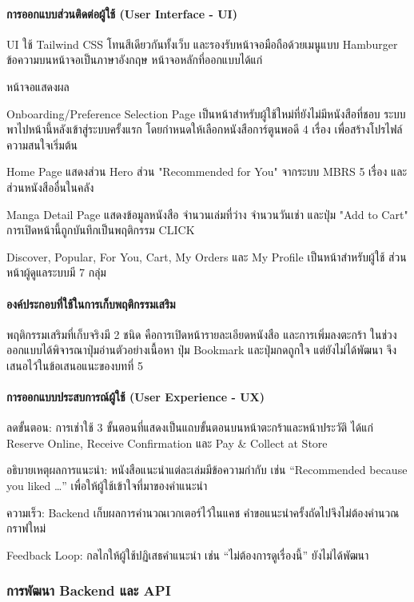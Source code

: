 \paragraph{การออกแบบส่วนติดต่อผู้ใช้ (User Interface - UI)}
UI ใช้ Tailwind CSS โทนสีเดียวกันทั้งเว็บ และรองรับหน้าจอมือถือด้วยเมนูแบบ Hamburger ข้อความบนหน้าจอเป็นภาษาอังกฤษ หน้าจอหลักที่ออกแบบได้แก่

หน้าจอแสดงผล


Onboarding/Preference Selection Page เป็นหน้าสำหรับผู้ใช้ใหม่ที่ยังไม่มีหนังสือที่ชอบ ระบบพาไปหน้านี้หลังเข้าสู่ระบบครั้งแรก โดยกำหนดให้เลือกหนังสือการ์ตูนพอดี 4 เรื่อง เพื่อสร้างโปรไฟล์ความสนใจเริ่มต้น 

Home Page แสดงส่วน Hero ส่วน "Recommended for You" จากระบบ MBRS 5 เรื่อง และส่วนหนังสืออื่นในคลัง

Manga Detail Page แสดงข้อมูลหนังสือ จำนวนเล่มที่ว่าง จำนวนวันเช่า และปุ่ม "Add to Cart" การเปิดหน้านี้ถูกบันทึกเป็นพฤติกรรม CLICK

Discover, Popular, For You, Cart, My Orders และ My Profile เป็นหน้าสำหรับผู้ใช้ ส่วนหน้าผู้ดูแลระบบมี 7 กลุ่ม

\paragraph{องค์ประกอบที่ใช้ในการเก็บพฤติกรรมเสริม}
พฤติกรรมเสริมที่เก็บจริงมี 2 ชนิด คือการเปิดหน้ารายละเอียดหนังสือ และการเพิ่มลงตะกร้า ในช่วงออกแบบได้พิจารณาปุ่มอ่านตัวอย่างเนื้อหา ปุ่ม Bookmark และปุ่มกดถูกใจ แต่ยังไม่ได้พัฒนา จึงเสนอไว้ในข้อเสนอแนะของบทที่ 5

\paragraph{การออกแบบประสบการณ์ผู้ใช้ (User Experience - UX)}

ลดขั้นตอน: การเช่าใช้ 3 ขั้นตอนที่แสดงเป็นแถบขั้นตอนบนหน้าตะกร้าและหน้าประวัติ ได้แก่ Reserve Online, Receive Confirmation และ Pay \& Collect at Store

อธิบายเหตุผลการแนะนำ: หนังสือแนะนำแต่ละเล่มมีข้อความกำกับ เช่น ``Recommended because you liked \ldots'' เพื่อให้ผู้ใช้เข้าใจที่มาของคำแนะนำ

ความเร็ว: Backend เก็บผลการคำนวณเวกเตอร์ไว้ในแคช คำขอแนะนำครั้งถัดไปจึงไม่ต้องคำนวณกราฟใหม่

Feedback Loop: กลไกให้ผู้ใช้ปฏิเสธคำแนะนำ เช่น ``ไม่ต้องการดูเรื่องนี้'' ยังไม่ได้พัฒนา


\subsubsection{การพัฒนา Backend และ API}

